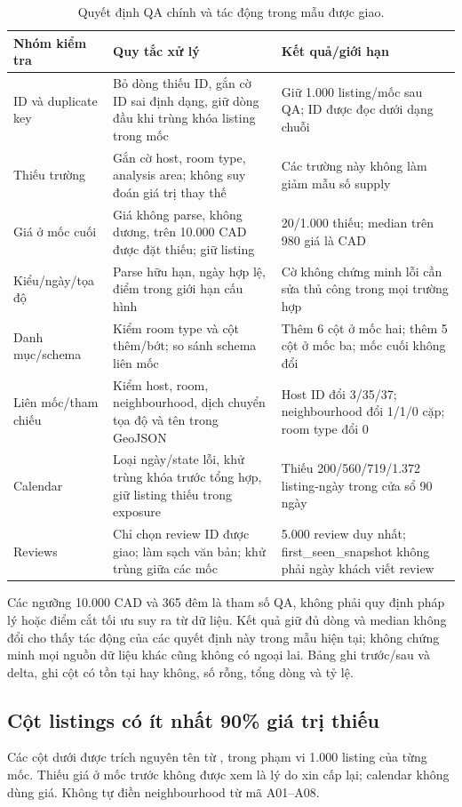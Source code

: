 \documentclass[11pt,a4paper]{article}
\begin{document}
\begin{table}[htbp]\centering\small
\caption{Quyết định QA chính và tác động trong mẫu được giao.}
\begin{tabularx}{\linewidth}{@{}P{3.25cm}YY@{}}\toprule
Nhóm kiểm tra & Quy tắc xử lý & Kết quả/giới hạn\\\midrule
ID và duplicate key & Bỏ dòng thiếu ID, gắn cờ ID sai định dạng, giữ dòng đầu khi trùng khóa listing trong mốc & Giữ 1.000 listing/mốc sau QA; ID được đọc dưới dạng chuỗi\\
Thiếu trường & Gắn cờ host, room type, analysis area; không suy đoán giá trị thay thế & Các trường này không làm giảm mẫu số supply\\
Giá ở mốc cuối & Giá không parse, không dương, trên 10.000 CAD được đặt thiếu; giữ listing & 20/1.000 thiếu; median trên 980 giá là \GlobalMedian{} CAD\\
Kiểu/ngày/tọa độ & Parse hữu hạn, ngày hợp lệ, điểm trong giới hạn cấu hình & Cờ không chứng minh lỗi cần sửa thủ công trong mọi trường hợp\\
Danh mục/schema & Kiểm room type và cột thêm/bớt; so sánh schema liên mốc & Thêm 6 cột ở mốc hai; thêm 5 cột ở mốc ba; mốc cuối không đổi\\
Liên mốc/tham chiếu & Kiểm host, room, neighbourhood, dịch chuyển tọa độ và tên trong GeoJSON & Host ID đổi 3/35/37; neighbourhood đổi 1/1/0 cặp; room type đổi 0\\
Calendar & Loại ngày/state lỗi, khử trùng khóa trước tổng hợp, giữ listing thiếu trong exposure & Thiếu 200/560/719/1.372 listing-ngày trong cửa sổ 90 ngày\\
Reviews & Chỉ chọn review ID được giao; làm sạch văn bản; khử trùng giữa các mốc & 5.000 review duy nhất; first\_seen\_snapshot không phải ngày khách viết review\\\bottomrule
\end{tabularx}
\end{table}

Các ngưỡng 10.000 CAD và 365 đêm là tham số QA, không phải quy định pháp lý hoặc điểm cắt tối ưu suy ra từ dữ liệu. Kết quả giữ đủ dòng và median không đổi cho thấy tác động của các quyết định này trong mẫu hiện tại; không chứng minh mọi nguồn dữ liệu khác cũng không có ngoại lai. Bảng  ghi trước/sau và delta,  ghi cột có tồn tại hay không, số rỗng, tổng dòng và tỷ lệ.

\subsection{Cột listings có ít nhất 90\% giá trị thiếu}
Các cột dưới được trích nguyên tên từ , trong phạm vi 1.000 listing của từng mốc. Thiếu giá ở mốc trước không được xem là lý do xin cấp lại; calendar không dùng giá. Không tự điền neighbourhood từ mã A01--A08.

\end{document}
